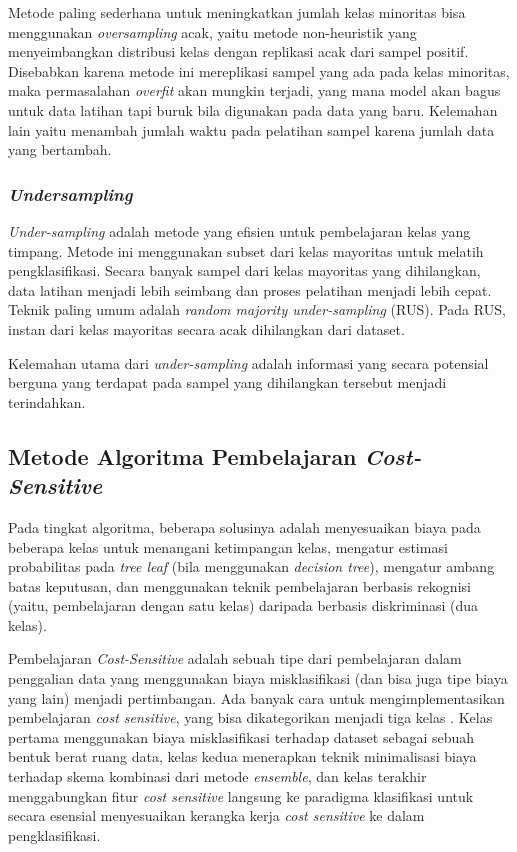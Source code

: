 \documentclass[12pt,a4paper,titlepage]{article}
\begin{document}
Metode paling sederhana untuk meningkatkan jumlah kelas minoritas bisa menggunakan \textit{oversampling} acak, yaitu metode non-heuristik yang menyeimbangkan distribusi kelas dengan replikasi acak dari sampel positif.
Disebabkan karena metode ini mereplikasi sampel yang ada pada kelas minoritas, maka permasalahan \textit{overfit} akan mungkin terjadi, yang mana model akan bagus untuk data latihan tapi buruk bila digunakan pada data yang baru.
Kelemahan lain yaitu menambah jumlah waktu pada pelatihan sampel karena jumlah data yang bertambah.

\subsubsection{\textit{Undersampling}}\label{subsubsec:undersampling}

\textit{Under-sampling} adalah metode yang efisien untuk pembelajaran kelas yang timpang.
Metode ini menggunakan subset dari kelas mayoritas untuk melatih pengklasifikasi.
Secara banyak sampel dari kelas mayoritas yang dihilangkan, data latihan menjadi lebih seimbang dan proses pelatihan menjadi lebih cepat.
Teknik paling umum adalah \textit{random majority under-sampling} (RUS).
Pada RUS, instan dari kelas mayoritas secara acak dihilangkan dari dataset.

Kelemahan utama dari \textit{under-sampling} adalah informasi yang secara potensial berguna yang terdapat pada sampel yang dihilangkan tersebut menjadi terindahkan.

\subsection{Metode Algoritma Pembelajaran \textit{Cost-Sensitive}}

Pada tingkat algoritma, beberapa solusinya adalah menyesuaikan biaya pada beberapa kelas untuk menangani ketimpangan kelas, mengatur estimasi probabilitas pada \textit{tree leaf} (bila menggunakan \textit{decision tree}), mengatur ambang batas keputusan, dan menggunakan teknik pembelajaran berbasis rekognisi (yaitu, pembelajaran dengan satu kelas) daripada berbasis diskriminasi (dua kelas).

Pembelajaran \textit{Cost-Sensitive} adalah sebuah tipe dari pembelajaran dalam penggalian data yang menggunakan biaya misklasifikasi (dan bisa juga tipe biaya yang lain) menjadi pertimbangan.
Ada banyak cara untuk mengimplementasikan pembelajaran \textit{cost sensitive}, yang bisa dikategorikan menjadi tiga kelas \cite{he2009learning}.
Kelas pertama menggunakan biaya misklasifikasi terhadap dataset sebagai sebuah bentuk berat ruang data, kelas kedua menerapkan teknik minimalisasi biaya terhadap skema kombinasi dari metode \textit{ensemble}, dan kelas terakhir menggabungkan fitur \textit{cost sensitive} langsung ke paradigma klasifikasi untuk secara esensial menyesuaikan kerangka kerja \textit{cost sensitive} ke dalam pengklasifikasi.
\end{document}
